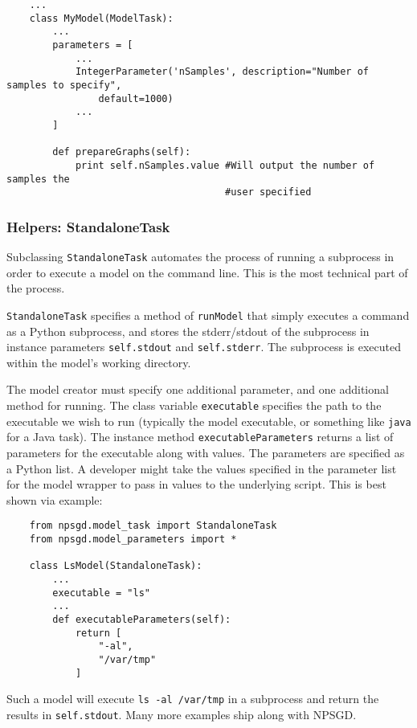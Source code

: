 \documentclass{article}
\newcommand{\mclass}[1]{\texttt{#1}}
\begin{document}
\begin{lstlisting}
    ...
    class MyModel(ModelTask):
        ...
        parameters = [
            ...
            IntegerParameter('nSamples', description="Number of samples to specify",
                default=1000)
            ...
        ]

        def prepareGraphs(self):
            print self.nSamples.value #Will output the number of samples the
                                      #user specified

\end{lstlisting}

\subsubsection{Helpers: StandaloneTask}
Subclassing \mclass{StandaloneTask} automates the process of running a
subprocess in order to execute a model on the command line. This is the most
technical part of the process.

\mclass{StandaloneTask} specifies a method of \texttt{runModel} that simply
executes a command as a Python subprocess, and stores the stderr/stdout of the
subprocess in instance parameters \texttt{self.stdout} and \texttt{self.stderr}.
The subprocess is executed within the model's working directory. 

The model creator must specify one additional parameter, and one additional
method for running. The class variable \texttt{executable} specifies the path to
the executable we wish to run (typically the model executable, or something like
\texttt{java} for a Java task). The instance method \texttt{executableParameters} returns
a list of parameters for the executable along with values. The parameters are
specified as a Python list. A developer might take the values specified in the
parameter list for the model wrapper to pass in values to the underlying script. This is best shown via example:

\begin{lstlisting}
    from npsgd.model_task import StandaloneTask
    from npsgd.model_parameters import *

    class LsModel(StandaloneTask):
        ...
        executable = "ls"
        ...
        def executableParameters(self):
            return [
                "-al",
                "/var/tmp"
            ]
\end{lstlisting}

Such a model will execute \texttt{ls -al /var/tmp} in a subprocess and return the results in
\texttt{self.stdout}. Many more examples ship along with NPSGD.
\end{document}
